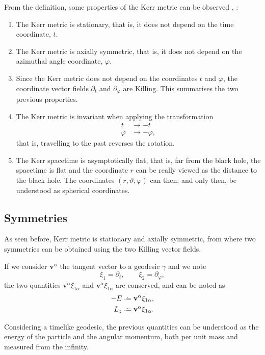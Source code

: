 From the definition, some properties of the Kerr metric can be observed \cite[Sec. 2.1]{galindo14}, \cite[pp. 58-59]{oneill95}:
\begin{enumerate}
	\item The Kerr metric is stationary, that is, it does not depend on the time coordinate, $t$.
	\item The Kerr metric is axially symmetric, that is, it does not depend on the azimuthal angle coordinate, $\varphi$.
	\item Since the Kerr metric does not depend on the coordinates $t$ and $\varphi$, the coordinate vector fields $\partial_t$ and $\partial_\varphi$ are Killing. This summarises the two previous properties.
	\item The Kerr metric is invariant when applying the transformation
	\begin{align*}
	t &\to -t \\
	\varphi &\to -\varphi,
	\end{align*}
	that is, travelling to the past reverses the rotation.
	\item The Kerr spacetime is asymptotically flat, that is, far from the black hole, the spacetime is flat and the coordinate $r$ can be really viewed as the distance to the black hole. The coordinates $(r, \vartheta, \varphi)$ can then, and only then, be understood as spherical coordinates.
\end{enumerate}

\subsection{Symmetries}

As seen before, Kerr metric is stationary and axially symmetric, from where two symmetries can be obtained using the two Killing vector fields.

If we consider $\mathbf{v}^\alpha$ the tangent vector to a geodesic $\gamma$ and we note
\[
\xi_1 = \partial_t, \qquad \xi_2 = \partial_\varphi,
\]
the two quantities $\mathbf{v}^\alpha \xi_{1\alpha}$ and $\mathbf{v}^\alpha \xi_{1\alpha}$ are conserved, and can be noted as
\begin{align}
\label{eq:energy}
-E &\defeq \mathbf{v}^\alpha \xi_{1\alpha}, \\
L_z &\defeq \mathbf{v}^\alpha \xi_{1\alpha}.
\end{align}

Considering a timelike geodesic, the previous quantities can be understood as the energy of the particle and the angular momentum, both per unit mass and measured from the infinity.

